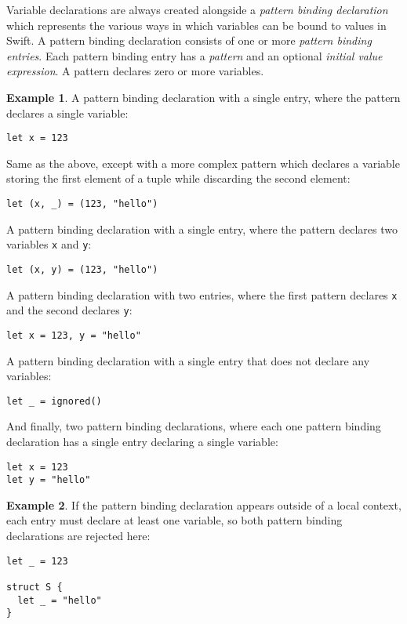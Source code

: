 \documentclass[a4paper,headsepline,bibliography=totoc,toc=flat,fleqn,twoside=semi]{scrbook}
\theoremstyle{definition}
\theoremstyle{definition}
\newtheorem{example}{Example}[chapter]
\theoremstyle{definition}
\begin{document}
Variable declarations are always created alongside a \emph{pattern binding declaration} which represents the various ways in which variables can be bound to values in Swift. A pattern binding declaration consists of one or more \emph{pattern binding entries}. Each pattern binding entry has a \emph{pattern} and an optional \emph{initial value expression}. A pattern declares zero or more variables.

\begin{example}
A pattern binding declaration with a single entry, where the pattern declares a single variable:
\begin{Verbatim}
let x = 123
\end{Verbatim}
Same as the above, except with a more complex pattern which declares a variable storing the first element of a tuple while discarding the second element:
\begin{Verbatim}
let (x, _) = (123, "hello")
\end{Verbatim}
A pattern binding declaration with a single entry, where the pattern declares two variables \texttt{x} and \texttt{y}:
\begin{Verbatim}
let (x, y) = (123, "hello")
\end{Verbatim}
A pattern binding declaration with two entries, where the first pattern declares \texttt{x} and the second declares \texttt{y}:
\begin{Verbatim}
let x = 123, y = "hello"
\end{Verbatim}
A pattern binding declaration with a single entry that does not declare any variables:
\begin{Verbatim}
let _ = ignored()
\end{Verbatim}
And finally, two pattern binding declarations, where each one pattern binding declaration has a single entry declaring a single variable:
\begin{Verbatim}
let x = 123
let y = "hello"
\end{Verbatim}
\end{example}
\begin{example}
If the pattern binding declaration appears outside of a local context, each entry must declare at least one variable, so both pattern binding declarations are rejected here:
\begin{Verbatim}
let _ = 123

struct S {
  let _ = "hello"
}
\end{Verbatim}
\end{example}
\end{document}
